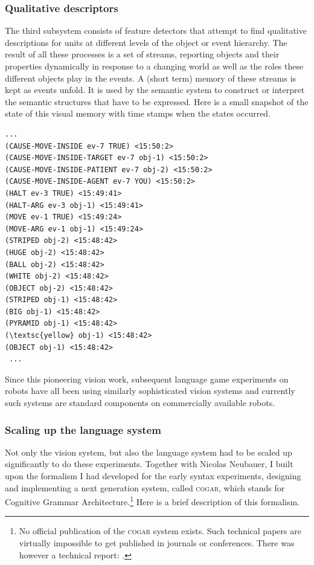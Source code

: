 \subsubsection{Qualitative descriptors} 
The third subsystem consists of feature detectors that attempt to find qualitative descriptions for units at different levels 
of the object or event hierarchy. The result of all these processes is a set of streams, reporting objects and their 
properties dynamically in response to a changing world as well as the roles these different objects play in the events. 
A (short term) memory of these streams is kept as events unfold. It is used by the semantic system to construct or 
interpret the semantic structures that have to be expressed. Here is a small snapshot of the state of 
this visual memory with time stamps when the states occurred. 

\begin{verbatim}
... 
(CAUSE-MOVE-INSIDE ev-7 TRUE) <15:50:2>
(CAUSE-MOVE-INSIDE-TARGET ev-7 obj-1) <15:50:2>
(CAUSE-MOVE-INSIDE-PATIENT ev-7 obj-2) <15:50:2>
(CAUSE-MOVE-INSIDE-AGENT ev-7 YOU) <15:50:2>
(HALT ev-3 TRUE) <15:49:41>
(HALT-ARG ev-3 obj-1) <15:49:41>
(MOVE ev-1 TRUE) <15:49:24>
(MOVE-ARG ev-1 obj-1) <15:49:24>
(STRIPED obj-2) <15:48:42>
(HUGE obj-2) <15:48:42>
(BALL obj-2) <15:48:42>
(WHITE obj-2) <15:48:42>
(OBJECT obj-2) <15:48:42>
(STRIPED obj-1) <15:48:42>
(BIG obj-1) <15:48:42>
(PYRAMID obj-1) <15:48:42>
(\textsc{yellow} obj-1) <15:48:42>
(OBJECT obj-1) <15:48:42>
 ...
\end{verbatim}

Since this pioneering vision work, subsequent language game experiments on robots have all been using 
similarly sophisticated vision systems and currently such systems are standard components on commercially available
robots. 

\subsubsection{Scaling up the language system}
Not only the vision system, but also the language system had to be scaled up significantly to do these experiments. 
Together with Nicolas Neubauer, I built upon the formalism I had developed for the early syntax experiments, 
designing and implementing a next generation system, called \textsc{cogar},  which stands for 
Cognitive Grammar Architecture.\footnote{
No official publication of the \textsc{cogar} system exists. Such technical papers are virtually impossible to get 
published in journals or conferences. There was however a technical report: \cite{Steels:2001}.}
Here is a brief description of this formalism. 

